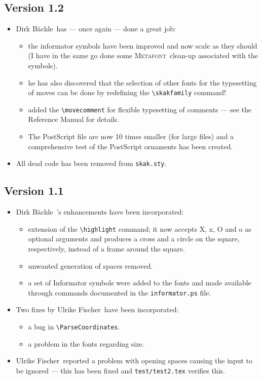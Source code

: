 \documentclass[11pt,twocolumn]{article}
\newcommand{\metafont}{\textsc{Metafont}\ }
\newcommand{\filename}[1]{\texttt{#1}}
\newcommand{\Dirk}{Dirk B\"achle\ }
\newcommand{\Ulrike}{Ulrike Fischer\ }
\begin{document}
\subsection*{Version 1.2}
\label{sec:version-1.2}

\begin{itemize}
\item \Dirk has --- once again --- done a great job:
  \begin{itemize}
  \item the informator symbols have been improved and now scale as
    they should (I have in the same go done some \metafont clean-up
    associated with the symbols).
  \item he has also discovered that the selection of other fonts for
    the typesetting of moves can be done by redefining the
    \verb|\skakfamily| command!
  \item added the \verb|\movecomment| for flexible typesetting of
    comments --- see the Reference Manual for details.
  \item The PostScript file are now 10 times smaller (for large files)
    and a comprehensive test of the PostScript ornaments has been
    created. 
  \end{itemize}
\item All dead code has been removed from \texttt{skak.sty}.
\end{itemize}


\subsection*{Version 1.1}
\label{sec:version-1.1}

\begin{itemize}
\item \Dirk's enhancements have been incorporated:
  \begin{itemize}
  \item extension of the \verb|\highlight| command; it now accepts X,
    x, O and o as optional arguments and produces a cross and a
    circle on the square, respectively, instead of a frame around the
    square.
  \item unwanted generation of spaces removed.
  \item a set of Informator symbols were added to the fonts and made
    available through commands documented in the
    \texttt{informator.ps} file.
  \end{itemize}
\item Two fixes by \Ulrike have been incorporated:
  \begin{itemize}
  \item a bug in \verb|\ParseCoordinates|.
  \item a problem in the fonts regarding size.
  \end{itemize}
\item \Ulrike reported a problem with opening spaces causing the input
  to be ignored --- this has been fixed and \filename{test/test2.tex}
  verifies this.
\end{itemize}
\end{document}
